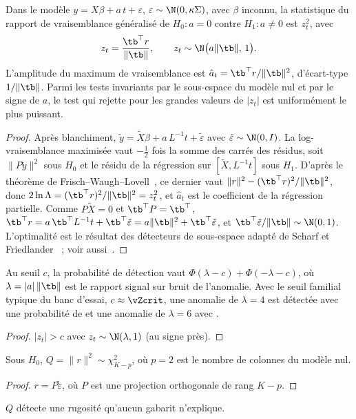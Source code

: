 \begin{theorem}\label{thm-glrt}
Dans le modèle $y=X\beta+a\,t+\varepsilon$, $\varepsilon\sim\N(0,\kappa\Sigma)$, avec $\beta$ inconnu, la statistique du
rapport de vraisemblance généralisé de $H_0:a=0$ contre $H_1:a\ne0$ est $z_t^2$, avec
\begin{equation}\label{eq-z}
z_t=\frac{\tb^\top r}{\|\tb\|},\qquad z_t\sim\N\bigl(a\|\tb\|,\,1\bigr).
\end{equation}
L'amplitude du maximum de vraisemblance est $\hat a_t=\tb^\top r/\|\tb\|^2$, d'écart-type $1/\|\tb\|$. Parmi les tests
invariants par le sous-espace du modèle nul et par le signe de $a$, le test qui rejette pour les grandes valeurs de
$|z_t|$ est uniformément le plus puissant.
\end{theorem}
\begin{proof}
Après blanchiment, $\tilde y=\tilde X\beta+a\,L^{-1}t+\tilde\varepsilon$ avec $\tilde\varepsilon\sim\N(0,I)$. La
log-vraisemblance maximisée vaut $-\frac12$ fois la somme des carrés des résidus, soit $\|P\tilde y\|^2$ sous $H_0$ et le
résidu de la régression sur $[\tilde X,L^{-1}t]$ sous $H_1$. D'après le théorème de Frisch--Waugh--Lovell~\cite{lovell1963},
ce dernier vaut $\|r\|^2-(\tb^\top r)^2/\|\tb\|^2$, donc $2\ln\Lambda=(\tb^\top r)^2/\|\tb\|^2=z_t^2$, et $\hat a_t$ est le
coefficient de la régression partielle. Comme $P\tilde X=0$ et $\tb^\top P=\tb^\top$,
$\tb^\top r=a\,\tb^\top L^{-1}t+\tb^\top\tilde\varepsilon=a\|\tb\|^2+\tb^\top\tilde\varepsilon$, et
$\tb^\top\tilde\varepsilon/\|\tb\|\sim\N(0,1)$. L'optimalité est le résultat des détecteurs de sous-espace adapté de
Scharf et Friedlander~\cite{scharf1994} ; voir aussi~\cite{kay1998}.
\end{proof}

\begin{corollary}\label{cor-power}
Au seuil $c$, la probabilité de détection vaut $\Phi(\lambda-c)+\Phi(-\lambda-c)$, où $\lambda=|a|\,\|\tb\|$ est le rapport
signal sur bruit de l'anomalie. Avec le seuil familial typique du banc d'essai, $c\approx\vZcrit$, une anomalie de
$\lambda=4$ est détectée avec une probabilité de \vPowThFour{} et une anomalie de $\lambda=6$ avec \vPowThSix.
\end{corollary}
\begin{proof}
$|z_t|>c$ avec $z_t\sim\N(\lambda,1)$ (au signe près).
\end{proof}

\begin{proposition}\label{prop-q}
Sous $H_0$, $Q=\|r\|^2\sim\chi^2_{K-p}$, où $p=2$ est le nombre de colonnes du modèle nul.
\end{proposition}
\begin{proof}
$r=P\tilde\varepsilon$, où $P$ est une projection orthogonale de rang $K-p$.
\end{proof}
$Q$ détecte une rugosité qu'aucun gabarit n'explique.

